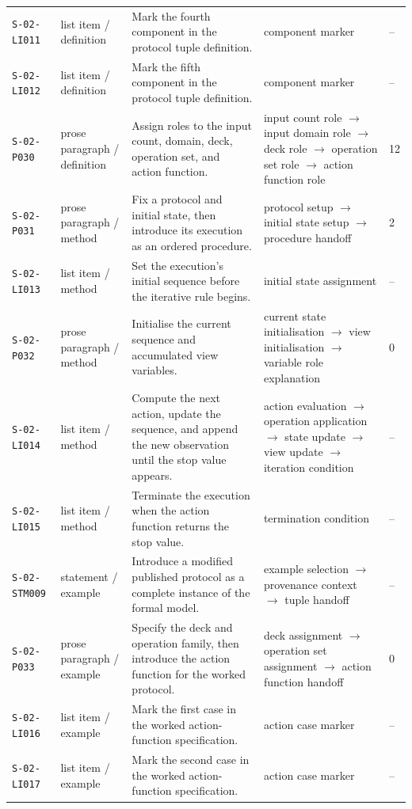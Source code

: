 \documentclass[10pt]{article}
\begin{document}
\begin{longtable}{@{}p{}p{}p{}p{}p{}@{}}
\texttt{S-02-LI011}&list item / definition&Mark the fourth component in the protocol tuple definition.&component marker&--\\
\texttt{S-02-LI012}&list item / definition&Mark the fifth component in the protocol tuple definition.&component marker&--\\
\texttt{S-02-P030}&prose paragraph / definition&Assign roles to the input count, domain, deck, operation set, and action function.&input count role $\rightarrow$ input domain role $\rightarrow$ deck role $\rightarrow$ operation set role $\rightarrow$ action function role&12\\
\texttt{S-02-P031}&prose paragraph / method&Fix a protocol and initial state, then introduce its execution as an ordered procedure.&protocol setup $\rightarrow$ initial state setup $\rightarrow$ procedure handoff&2\\
\texttt{S-02-LI013}&list item / method&Set the execution's initial sequence before the iterative rule begins.&initial state assignment&--\\
\texttt{S-02-P032}&prose paragraph / method&Initialise the current sequence and accumulated view variables.&current state initialisation $\rightarrow$ view initialisation $\rightarrow$ variable role explanation&0\\
\texttt{S-02-LI014}&list item / method&Compute the next action, update the sequence, and append the new observation until the stop value appears.&action evaluation $\rightarrow$ operation application $\rightarrow$ state update $\rightarrow$ view update $\rightarrow$ iteration condition&--\\
\texttt{S-02-LI015}&list item / method&Terminate the execution when the action function returns the stop value.&termination condition&--\\
\texttt{S-02-STM009}&statement / example&Introduce a modified published protocol as a complete instance of the formal model.&example selection $\rightarrow$ provenance context $\rightarrow$ tuple handoff&--\\
\texttt{S-02-P033}&prose paragraph / example&Specify the deck and operation family, then introduce the action function for the worked protocol.&deck assignment $\rightarrow$ operation set assignment $\rightarrow$ action function handoff&0\\
\texttt{S-02-LI016}&list item / example&Mark the first case in the worked action-function specification.&action case marker&--\\
\texttt{S-02-LI017}&list item / example&Mark the second case in the worked action-function specification.&action case marker&--\\

\end{longtable}
\end{document}
